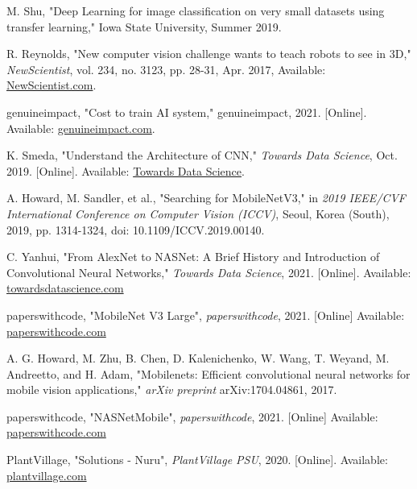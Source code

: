 \documentclass[conference]{IEEEtran}
\begin{document}
\begin{thebibliography}{00}
 M. Shu, "Deep Learning for image classification on very small datasets using transfer learning," Iowa State University, Summer 2019.

 R. Reynolds, "New computer vision challenge wants to teach robots to see in 3D," \textit{NewScientist}, vol. 234, no. 3123, pp. 28-31, Apr. 2017, Available: \href{https://www.newscientist.com/article/2127131-new-computer-vision-challenge-wants-to-teach-robots-to-see-in-3d/}{NewScientist.com}.

 genuineimpact, "Cost to train AI system," genuineimpact, 2021. [Online]. Available: \href{https://i.redd.it/c9lyy4252qia1.png}{genuineimpact.com}.

 K. Smeda, "Understand the Architecture of CNN," \textit{Towards Data Science}, Oct. 2019. [Online]. Available: \href{https://towardsdatascience.com/understand-the-architecture-of-cnn-90a25e244c7}{Towards Data Science}.


 A. Howard, M. Sandler, et al., "Searching for MobileNetV3," in \textit{2019 IEEE/CVF International Conference on Computer Vision (ICCV)}, Seoul, Korea (South), 2019, pp. 1314-1324, doi: 10.1109/ICCV.2019.00140.

 C. Yanhui, "From AlexNet to NASNet: A Brief History and Introduction of Convolutional Neural Networks," \textit{Towards Data Science}, 2021. [Online]. Available: \href{https://towardsdatascience.com/from-alexnet-to-NASNet-a-brief-history-and-introduction-of-convolutional-neural-networks-cf63bf3320e1}{towardsdatascience.com}

 paperswithcode, "MobileNet V3 Large", \textit{paperswithcode}, 2021. [Online] Available: \href{https://paperswithcode.com/lib/torchvision/mobilenet-v3}{paperswithcode.com}

 A. G. Howard, M. Zhu, B. Chen, D. Kalenichenko, W. Wang, T. Weyand, M. Andreetto, and H. Adam, "Mobilenets: Efficient convolutional neural networks for mobile vision applications," \textit{arXiv preprint} arXiv:1704.04861, 2017.

 paperswithcode, "NASNetMobile", \textit{paperswithcode}, 2021. [Online] Available: \href{https://paperswithcode.com/lib/torchvision/mnasnet-1-0}{paperswithcode.com}


 PlantVillage, "Solutions - Nuru", \textit{PlantVillage PSU}, 2020. [Online]. Available: \href{https://plantvillage.psu.edu/projects}{plantvillage.com}


\end{thebibliography}
\end{document}
